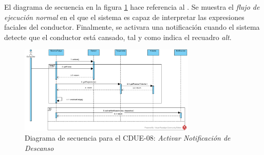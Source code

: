 \par El diagrama de secuencia  en la figura \ref{img:noti_descanso} hace referencia al . Se muestra el \textit{flujo de ejecución normal} en el que el sistema es capaz de interpretar las expresiones faciales del conductor. Finalmente, se activara una notificación cuando el sistema detecte que el conductor está cansado, tal y como indica el recuadro \textit{alt}.

\begin{figure}[h]
  \begin{center}
    \includegraphics[width=0.75\textwidth]{./img/diagramas_de_secuencia/CDUE-08.png}
  \end{center}
  \caption{Diagrama de secuencia para el CDUE-08: \textit{Activar Notificación de Descanso}}
  \label{img:noti_descanso}
\end{figure}
